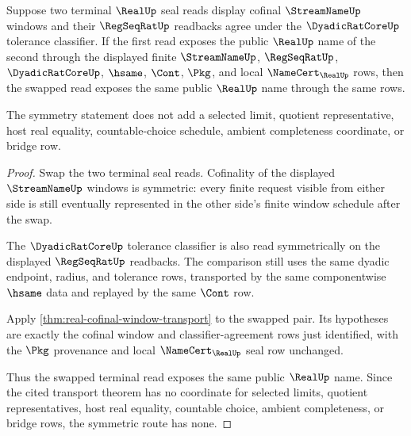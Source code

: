 \begin{theorem}
\label{thm:real-cofinal-window-symmetry}
Suppose two terminal $\RealUp$ seal reads display cofinal $\StreamNameUp$ windows and their $\RegSeqRatUp$ readbacks agree under the $\DyadicRatCoreUp$ tolerance classifier. If the first read exposes the public $\RealUp$ name of the second through the displayed finite $\StreamNameUp$, $\RegSeqRatUp$, $\DyadicRatCoreUp$, $\hsame$, $\Cont$, $\Pkg$, and local $\NameCert_{\RealUp}$ rows, then the swapped read exposes the same public $\RealUp$ name through the same rows.

The symmetry statement does not add a selected limit, quotient representative, host real equality, countable-choice schedule, ambient completeness coordinate, or bridge row.
\end{theorem}
\begin{proof}
Swap the two terminal seal reads. Cofinality of the displayed $\StreamNameUp$ windows is symmetric: every finite request visible from either side is still eventually represented in the other side's finite window schedule after the swap.

The $\DyadicRatCoreUp$ tolerance classifier is also read symmetrically on the displayed $\RegSeqRatUp$ readbacks. The comparison still uses the same dyadic endpoint, radius, and tolerance rows, transported by the same componentwise $\hsame$ data and replayed by the same $\Cont$ row.

Apply \autoref{thm:real-cofinal-window-transport} to the swapped pair. Its hypotheses are exactly the cofinal window and classifier-agreement rows just identified, with the $\Pkg$ provenance and local $\NameCert_{\RealUp}$ seal row unchanged.

Thus the swapped terminal read exposes the same public $\RealUp$ name. Since the cited transport theorem has no coordinate for selected limits, quotient representatives, host real equality, countable choice, ambient completeness, or bridge rows, the symmetric route has none.
\end{proof}
